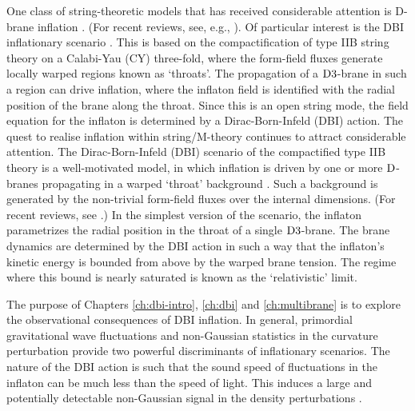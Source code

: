 One class of string-theoretic models that has received 
considerable attention is D-brane inflation
\cite{brane1,brane2,brane3,brane4,brane5,
brane6,brane7,brane8,brane9,brane10,brane11,brane12,brane13,
brane14,brane15,brane16,brane17,Brodie:2003qv,Vikman:2006hk, 
Mukhanov:2005bu,Kallosh:2007wm,brane18,
brane19,brane20,brane21}. 
(For recent reviews, see, e.g., \cite{tyereview,cline}). 
Of particular interest 
is the DBI inflationary scenario \cite{brane6,brane11}. 
This is based on the compactification of type IIB string theory on a 
Calabi-Yau (CY) three-fold, where the form-field fluxes generate locally
warped regions known as `throats'.  The propagation of a 
${\rm D3}$-brane in such a region can drive inflation, where the inflaton 
field is identified with the radial position of the brane 
along the throat. Since this is an open string mode, the field 
equation for the inflaton is determined by a Dirac-Born-Infeld (DBI) action. 
The quest to realise inflation within string/M-theory continues to 
attract considerable attention. The Dirac-Born-Infeld (DBI) scenario 
of the compactified type IIB theory is a well-motivated model, 
in which inflation is driven by one or more ${\rm D}$-branes 
propagating in a warped `throat' background
\cite{brane1,brane11,brane12,brane13, brane2,brane20,brane3, brane4,brane5,brane6}
. Such a background is generated 
by the non-trivial form-field fluxes over the internal dimensions. 
(For recent reviews, see
\cite{tyereview,McAllister:2007bg,Lorenz:2007ze,Kallosh:2007wm,Bean:2007eh,bean,
cline}.) 
In the simplest version of the scenario, 
the inflaton parametrizes the radial 
position in the throat of a single ${\rm D3}$-brane. 
The brane dynamics are determined by the DBI action in such a 
way that the inflaton's kinetic energy is bounded from above by the warped 
brane tension. The regime where this bound is nearly saturated is 
known as the `relativistic' limit.


The purpose of Chapters \ref{ch:dbi-intro}, \ref{ch:dbi} and \ref{ch:multibrane} is to 
explore the observational consequences of DBI inflation. 
In general, primordial gravitational wave fluctuations
and non-Gaussian statistics in the curvature perturbation provide 
two powerful discriminants of inflationary scenarios. 
The nature of the DBI action is such that the sound 
speed of fluctuations in the inflaton can be much less than the speed of 
light. This induces a large and potentially detectable non-Gaussian 
signal in the density perturbations \cite{brane6,brane11,lidser3,chenetal}. 



